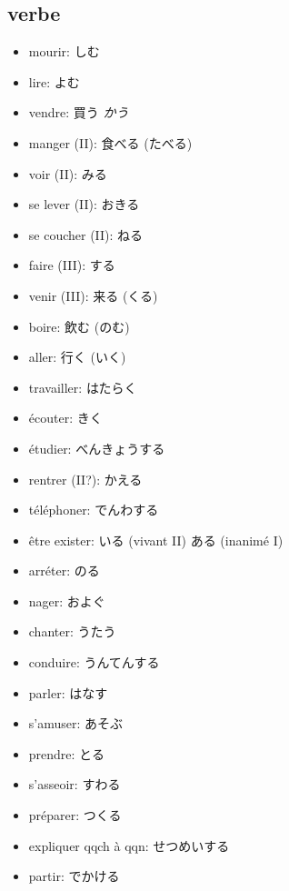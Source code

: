 \documentclass{article}
\begin{document}
\begin{CJK}{UTF8}{min}
    \subsection{verbe}
    \begin{itemize}
        \item mourir: しむ
        \item lire: よむ
        \item vendre: 買う \textit{かう}
        \item manger (II): 食べる (たべる)
        \item voir (II): みる
        \item se lever (II): おきる
        \item se coucher (II): ねる
        \item faire (III): する
        \item venir (III): 来る (くる)
        \item boire: 飲む (のむ)
        \item aller: 行く (いく)
        \item travailler: はたらく
        \item écouter: きく
        \item étudier: べんきょうする
        \item rentrer (II?):  かえる
        \item téléphoner: でんわする
        \item être exister: いる (vivant II) ある (inanimé I)
        \item arréter: のる
        \item nager: およぐ
        \item chanter: うたう
        \item conduire: うんてんする
        \item parler: はなす
        \item s'amuser: あそぶ
        \item prendre: とる
        \item s'asseoir: すわる
        \item préparer: つくる
        \item expliquer qqch à qqn: せつめいする
        \item partir: でかける
    \end{itemize}

\end{CJK}
\end{document}
